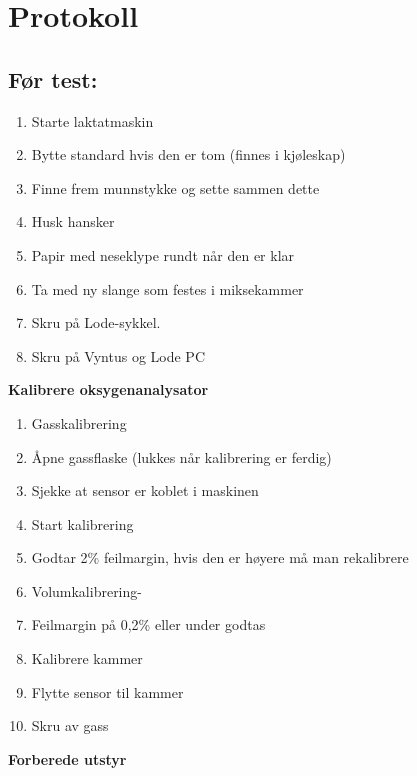 \documentclass[
  letterpaper,
  DIV=11,
  numbers=noendperiod]{scrreprt}
\providecommand{\tightlist}{%
  \setlength{\itemsep}{0pt}\setlength{\parskip}{0pt}}\usepackage{longtable,booktabs,array}
\begin{document}
\section{Protokoll}\label{protokoll-1}

\subsection{Før test:}\label{fuxf8r-test}

\begin{enumerate}
\def\labelenumi{\arabic{enumi}.}
\tightlist
\item
  Starte laktatmaskin
\item
  Bytte standard hvis den er tom (finnes i kjøleskap)
\item
  Finne frem munnstykke og sette sammen dette
\item
  Husk hansker
\item
  Papir med neseklype rundt når den er klar
\item
  Ta med ny slange som festes i miksekammer
\item
  Skru på Lode-sykkel.
\item
  Skru på Vyntus og Lode PC
\end{enumerate}

\textbf{Kalibrere oksygenanalysator}

\begin{enumerate}
\def\labelenumi{\arabic{enumi}.}
\tightlist
\item
  Gasskalibrering
\item
  Åpne gassflaske (lukkes når kalibrering er ferdig)
\item
  Sjekke at sensor er koblet i maskinen
\item
  Start kalibrering
\item
  Godtar 2\% feilmargin, hvis den er høyere må man rekalibrere
\item
  Volumkalibrering-
\item
  Feilmargin på 0,2\% eller under godtas
\item
  Kalibrere kammer
\item
  Flytte sensor til kammer
\item
  Skru av gass
\end{enumerate}

\textbf{Forberede utstyr}
\end{document}
